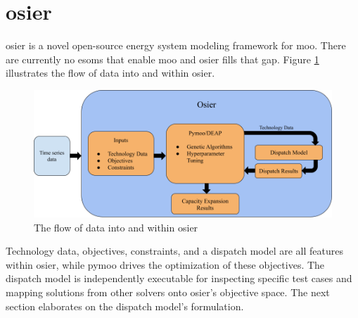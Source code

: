 \section{\acl{osier}}

\acf{osier} is a novel open-source energy system modeling framework for
\acl{moo}. There are currently no \acp{esom} that enable \ac{moo} and \ac{osier}
fills that gap. Figure \ref{fig:osier_flow} illustrates the flow of data into
and within \ac{osier}.

\begin{figure}[H]
    \centering
    \includegraphics[width=\columnwidth]{figures/osier_flow}
    \caption{The flow of data into and within \ac{osier}}
    \label{fig:osier_flow}
\end{figure}

 Technology data, objectives, constraints, and a dispatch model are all features
within \ac{osier}, while \ac{pymoo} drives the optimization of these objectives.
The dispatch model is independently executable for inspecting specific test
cases and mapping solutions from other solvers onto \ac{osier}'s objective
space. The next section elaborates on the dispatch model's formulation.
